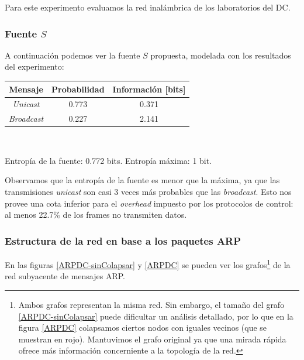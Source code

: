 \par Para este experimento evaluamos la red inalámbrica de los laboratorios del DC.

\subsubsection{Fuente $S$}

\par A continuación podemos ver la fuente $S$ propuesta, modelada con los resultados del experimento: \\

\begin{tabular}{ | c | c | c |}
    \hline
    Mensaje & Probabilidad & Información [bits] \\
    \hline
    \textit{Unicast} & 0.773 & 0.371 \\
    \hline
    \textit{Broadcast} & 0.227 & 2.141 \\
    \hline
\end{tabular} \\

\par Entropía de la fuente: 0.772 bits. Entropía máxima: 1 bit.

\par Observamos que la entropía de la fuente es menor que la máxima, ya que las transmisiones \textit{unicast} son casi 3 veces más probables que las \textit{broadcast}.
Esto nos provee una cota inferior para el \textit{overhead} impuesto por los protocolos de control: al menos 22.7\% de los frames no transmiten datos.

\subsubsection{Estructura de la red en base a los paquetes ARP}

\par En las figuras \ref{ARPDC-sinColapsar} y \ref{ARPDC} se pueden ver los grafos\footnote{Ambos grafos representan la misma red. Sin embargo, el tamaño del grafo \ref{ARPDC-sinColapsar} puede dificultar un análisis detallado, por lo que en la figura \ref{ARPDC} colapsamos ciertos nodos con iguales vecinos (que se muestran en rojo). Mantuvimos el grafo original ya que una mirada rápida ofrece más información concerniente a la topología de la red.} de la red subyacente de mensajes ARP.

